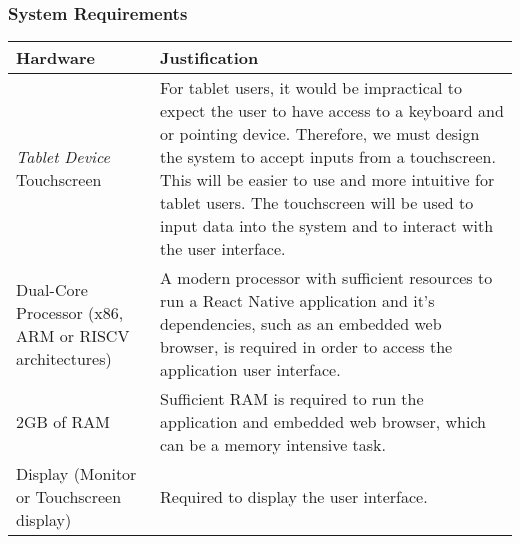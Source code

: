 \documentclass[../../../main.tex]{subfiles}
\begin{document}
\subsubsection{System Requirements}

\begin{tabular}{ |p{}|p{}| }
    \hline
    \textbf{Hardware}                                    & \textbf{Justification}                                                                                                                                                                                                                                   \\
    \hline
    \textit{Tablet Device}\newline
    Touchscreen                                          & For tablet users, it would be impractical to expect the user to have access to a keyboard and or pointing device. Therefore, we must design the system to accept inputs from a touchscreen.
    This will be easier to use and more intuitive for tablet users.
    The touchscreen will be used to input data into the system and to interact with the user interface.                                                                                                                                                                                                             \\
    \hline
    Dual-Core Processor
    \newline(x86, ARM or RISCV architectures)            &
    A modern processor with sufficient resources to run a React Native application and it's dependencies, such as an embedded web browser, is required in order to access the application user interface.                                                                                                           \\
    \hline
    2GB of RAM                                           & Sufficient RAM is required to run the application and embedded web browser, which can be a memory intensive task.                                                                                                                                        \\
    \hline
    Display (Monitor or Touchscreen display)             & Required to display the user interface.                                                                                                                                                                                                                  \\

\end{tabular}
\end{document}
